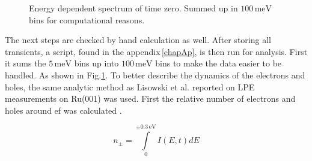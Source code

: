 \documentclass[a4paper,12pt,twoside]{article}
\begin{document}
	\begin{figure}[H]
		\caption{Energy dependent spectrum of time zero. Summed up in $100\,\mathrm{meV}$ bins for computational reasons.}
	    	\label{bins}
	\end{figure}
The next steps are checked by hand calculation as well. After storing all transients, a script, found in the appendix\,\ref{chapAp}, is then run for analysis. First it sums the $5\,\mathrm{meV}$ bins up into $100\,\mathrm{meV}$ bins to make the data easier to be handled. As shown in Fig.\ref{bins}.
To better describe the dynamics of the electrons and holes, the same analytic method as Lisowski et al. reported on \gls{LPE} measurements on Ru(001) was used. First the relative number of electrons and holes around \gls{ef} was calculated \cite{Lisowski2004}.
   
    \begin{equation}
        \label{releeq}
        n_{ \pm } = \int\limits_{0}^{\pm0.3\,\mathrm{eV}} I(E,t) dE
    \end{equation}
     \newline
   
\end{document}
